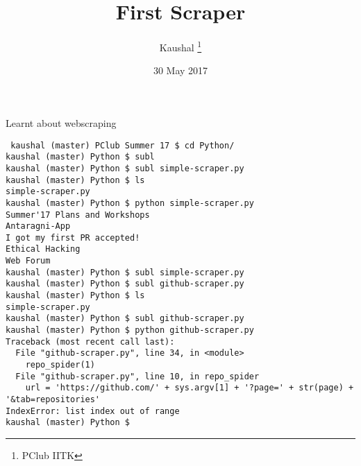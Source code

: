 \documentclass{article}
\title{First Scraper}
\author{Kaushal \thanks{PClub IITK}}
\date{30 May 2017}
\begin{document}
\maketitle
Learnt about webscraping
\begin{lstlisting}
 kaushal (master) PClub Summer 17 $ cd Python/
kaushal (master) Python $ subl
kaushal (master) Python $ subl simple-scraper.py
kaushal (master) Python $ ls
simple-scraper.py
kaushal (master) Python $ python simple-scraper.py 
Summer'17 Plans and Workshops
Antaragni-App
I got my first PR accepted!
Ethical Hacking
Web Forum
kaushal (master) Python $ subl simple-scraper.py 
kaushal (master) Python $ subl github-scraper.py
kaushal (master) Python $ ls
simple-scraper.py
kaushal (master) Python $ subl github-scraper.py
kaushal (master) Python $ python github-scraper.py 
Traceback (most recent call last):
  File "github-scraper.py", line 34, in <module>
    repo_spider(1)
  File "github-scraper.py", line 10, in repo_spider
    url = 'https://github.com/' + sys.argv[1] + '?page=' + str(page) + '&tab=repositories'
IndexError: list index out of range
kaushal (master) Python $ 

\end{lstlisting}
\end{document}

